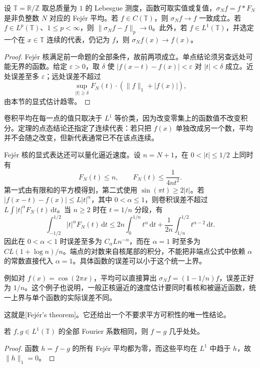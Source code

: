 \begin{theorem}[Fejér]\label{b2:thm:02-fejer}
设 \(\mathbb T=\mathbb R/\mathbb Z\) 取总质量为 \(1\) 的 Lebesgue 测度，函数可取实值或复值，\(\sigma_Nf=f*F_N\) 是非负整数 \(N\) 对应的 Fejér 平均。若 \(f\in C(\mathbb T)\)，则 \(\sigma_Nf\to f\) 一致成立。若 \(f\in L^p(\mathbb T)\)、\(1\leq p<\infty\)，则 \(\|\sigma_Nf-f\|_p\to0\)。此外，若 \(f\in L^1(\mathbb T)\)，并选定一个在 \(x\in\mathbb T\) 连续的代表，仍记为 \(f\)，则 \(\sigma_Nf(x)\to f(x)\)。
\end{theorem}
\begin{proof}
Fejér 核满足前一命题的全部条件，故前两项成立。单点结论须另查远处可能无界的函数。给定 \(\varepsilon>0\)，取 \(\delta\) 使 \(|f(x-t)-f(x)|<\varepsilon\) 对 \(|t|<\delta\) 成立。近处误差至多 \(\varepsilon\)；远处误差不超过
\[
 \sup_{|t|\geq\delta}F_N(t)\cdot(\|f\|_1+|f(x)|),
\]
由本节的显式估计趋零。
\end{proof}

卷积平均在每一点的值只取决于 \(L^1\) 等价类，因为改变零集上的函数值不改变积分。定理的点态结论还指定了连续代表：若只把 \(f(x)\) 单独改成另一个数，平均并不会随之改变，但新代表通常已不在该点连续。

\ProseParagraphBreak

Fejér 核的显式表达还可以量化逼近速度。设 \(n=N+1\)，在 \(0<|t|\leq1/2\) 上同时有
\[
 F_N(t)\leq n,\qquad F_N(t)\leq\frac1{4nt^2}.
\]
第一式由有限和的平方模得到，第二式使用 \(\sin(\pi t)\geq2|t|\)。若 \(|f(x-t)-f(x)|\leq L|t|^\alpha\)，其中 \(0<\alpha\leq1\)，则卷积误差不超过 \(L\int|t|^\alpha F_N(t)\,\mathrm dt\)。当 \(n\geq2\) 时在 \(t=1/n\) 分段，有
\[
 \int_{-1/2}^{1/2}|t|^\alpha F_N(t)\,\mathrm dt
 \leq 2n\int_0^{1/n}t^\alpha\,\mathrm dt
       +\frac1{2n}\int_{1/n}^{1/2}t^{\alpha-2}\,\mathrm dt.
\]
因此在 \(0<\alpha<1\) 时误差至多为 \(C_\alpha L n^{-\alpha}\)，而在 \(\alpha=1\) 时至多为 \(CL(1+\log n)/n\)。端点的对数来自核尾部的积分，不能把非端点公式中依赖 \(\alpha\) 的常数直接代入 \(\alpha=1\)。具体函数的误差可以小于这个统一上界。

\ProseParagraphBreak

例如对 \(f(x)=\cos(2\pi x)\)，平均可以直接算出 \(\sigma_Nf=(1-1/n)f\)，误差正好为 \(1/n\)。这个例子也说明，一般正核逼近的速度估计要同时看核和被逼近函数，统一上界与单个函数的实际误差不同。

\ProseParagraphBreak

这就是[Fejér's theorem]。它还给出一个不要求平方可积性的唯一性结论。

\begin{corollary}\label{b2:cor:02-uniqueness}
若 \(f,g\in L^1(\mathbb T)\) 的全部 Fourier 系数相同，则 \(f=g\) 几乎处处。
\end{corollary}
\begin{proof}
函数 \(h=f-g\) 的所有 Fejér 平均都为零，而这些平均在 \(L^1\) 中趋于 \(h\)，故 \(\|h\|_1=0\)。
\end{proof}

